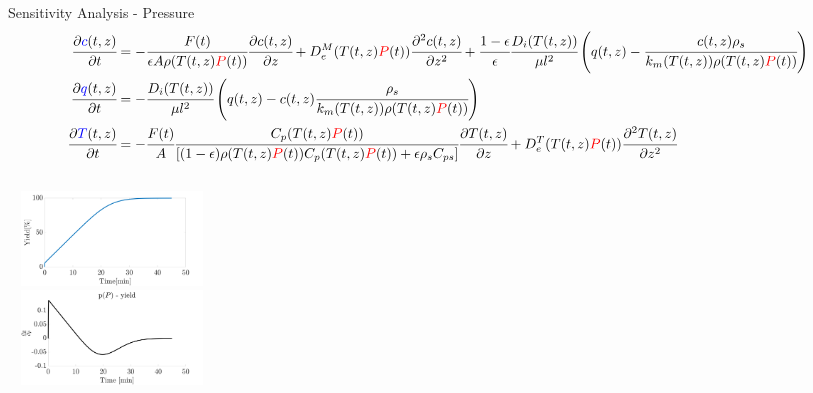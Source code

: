 \documentclass[8pt]{beamer}
\begin{document}
	\begin{frame}[fragile]{Sensitivity Analysis - Pressure}	
		\tiny{
	\begin{align*}
		\cfrac{\partial \textcolor{blue}{c}(t,z)}{\partial t} &=  -\cfrac{F(t)}{\epsilon A\rho(T(t,z)\textcolor{red}{P}(t))} \cfrac{\partial c(t,z)}{\partial z} 
		+ D^M_e(T(t,z)\textcolor{red}{P}(t)) \cfrac{\partial^2 c(t,z)}{\partial z^2} + \cfrac{1-\epsilon}{\epsilon} \cfrac{D_i(T(t,z))}{\mu l^2 }\left(q(t,z) - \cfrac{c(t,z)\rho_s}{k_m(T(t,z))\rho(T(t,z)\textcolor{red}{P}(t))} \right)\\
		\cfrac{\partial \textcolor{blue}{q}(t,z)}{\partial t} &= -\cfrac{D_i(T(t,z))}{\mu l^2 }\left(q(t,z) - c(t,z) \cfrac{\rho_s}{k_m(T(t,z))\rho(T(t,z)\textcolor{red}{P}(t))} \right)\\
		\cfrac{\partial \textcolor{blue}{T}(t,z)}{\partial t} &= -\cfrac{F(t)}{A} \cfrac{C_p(T(t,z)\textcolor{red}{P}(t))}{ [(1-\epsilon)\rho(T(t,z)\textcolor{red}{P}(t)) C_p(T(t,z)\textcolor{red}{P}(t)) + \epsilon \rho_s C_{ps} ]} \cfrac{\partial T(t,z)}{\partial z} 
		+ D^T_e(T(t,z)\textcolor{red}{P}(t)) \cfrac{\partial^2 T(t,z)}{\partial z^2}\\
	\end{align*}}		
		\begin{columns}[t]
			\centering
			\includegraphics[width=5.5cm,height=2.5cm]{Figures/Sensitivity/Yield.png}\\
			\centering
			\includegraphics[width=5.5cm,height=2.5cm]{Figures/Sensitivity/Plots/1_SS_R_P.png}\\
		\end{columns}	
	\end{frame}
\end{document}
